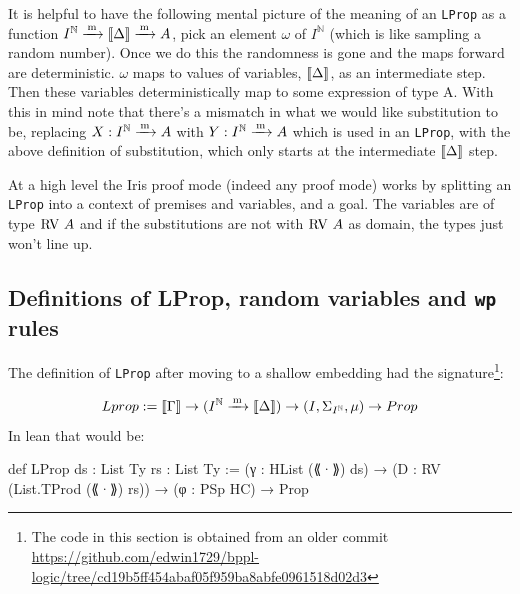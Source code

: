 It is helpful to have the following mental picture of the meaning of an \texttt{LProp} as a function $I^\mathbb{N} \xrightarrow{\,\mathrm{m}\,} \llbracket \Delta \rrbracket \xrightarrow{\,\mathrm{m}\,} A$, pick an element $\omega$ of $I^\mathbb{N}$
(which is like sampling a random number). Once we do this the randomness is gone and the maps forward are deterministic. $\omega$ maps to values of variables, $\llbracket \Delta \rrbracket$,
as an intermediate step. Then these variables deterministically map to some expression of type A. With this in mind note that there's a mismatch in what we would like substitution to be, replacing
$X : I^\mathbb{N} \xrightarrow{\,\mathrm{m}\,} A$ with $Y : I^\mathbb{N} \xrightarrow{\,\mathrm{m}\,} A$ which is used in an \texttt{LProp}, with the above definition of substitution, which only starts at the intermediate $\llbracket \Delta \rrbracket$ step.

At a high level the Iris proof mode (indeed any proof mode) works by splitting an \texttt{LProp} into a context of premises and variables, and a goal. The variables are of type $\mathrm{RV\ } A$ and if the substitutions are
not with $\mathrm{RV\ } A$ as domain, the types just won't line up.


\subsection{Definitions of LProp, random variables and \texttt{wp} rules}
\label{sec:parametrised}
The definition of \texttt{LProp} after moving to a shallow embedding had the signature\footnote{The code in this section is obtained from an older commit \url{https://github.com/edwin1729/bppl-logic/tree/cd19b5ff454abaf05f959ba8abfe0961518d02d3}}:

\[
Lprop := \llbracket \Gamma \rrbracket \to (I^\mathbb{N} \xrightarrow{\,\mathrm{m}\,} \llbracket \Delta \rrbracket) \to (I, \Sigma_{I^\mathbb{N}}, \mu) \to Prop
\]
In lean that would be:
\begin{leancode}
def LProp {ds : List Ty} {rs : List Ty} :=
  (γ : HList (⟪·⟫) ds) → (D : RV (List.TProd (⟪·⟫) rs)) → (φ : PSp HC) → Prop
\end{leancode}


